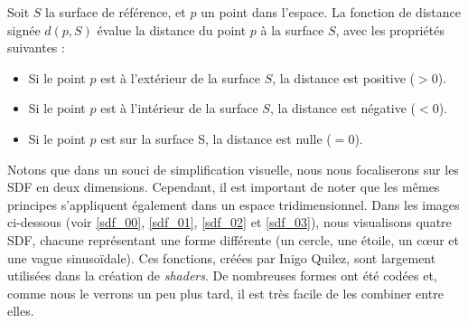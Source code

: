 Soit $S$ la surface de référence, et $p$ un point dans l'espace. La fonction de distance signée $d(p,S)$ évalue la distance du point 
$p$ à la surface $S$, avec les propriétés suivantes :

\begin{itemize}
    \item Si le point $p$ est à l'extérieur de la surface $S$, la distance est positive ($>0$).
    \item Si le point $p$ est à l'intérieur de la surface $S$, la distance est négative ($<0$).
    \item Si le point $p$ est sur la surface S, la distance est nulle ($=0$).
\end{itemize}

Notons que dans un souci de simplification visuelle, nous nous focaliserons sur les SDF en deux dimensions. Cependant, il est important de noter que les mêmes principes s'appliquent également dans un espace tridimensionnel. Dans les images ci-dessous (voir \ref{sdf_00}, \ref{sdf_01}, \ref{sdf_02} et \ref{sdf_03}), nous visualisons quatre SDF, chacune représentant une forme différente (un cercle, une étoile, un cœur et une vague sinusoïdale). Ces fonctions, créées par Inigo Quilez, sont largement utilisées dans la création de \textit{shaders}. De nombreuses formes ont été codées et, comme nous le verrons un peu plus tard, il est très facile de les combiner entre elles.

